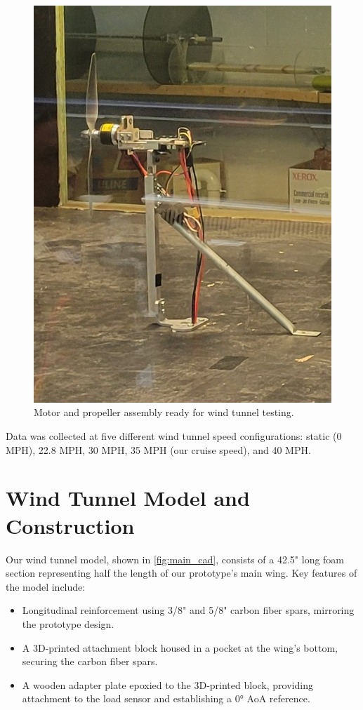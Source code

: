 \begin{figure}[htpb]
    \centering
    \includegraphics[width=0.88\linewidth]{figures/propulsion_data/motor_testing_setup.jpg}
    \caption{Motor and propeller assembly ready for wind tunnel testing.}
    \label{fig:motor_testing_setup}
\end{figure}

Data was collected at five different wind tunnel speed configurations: static (0 MPH), 22.8 MPH, 30 MPH, 35 MPH (our cruise speed), and 40 MPH.

\newpage

\section{Wind Tunnel Model and Construction}


Our wind tunnel model, shown in \autoref{fig:main_cad}, consists of a 42.5" long foam section representing half the length of our prototype's main wing. Key features of the model include:

\begin{itemize}
    \item Longitudinal reinforcement using 3/8" and 5/8" carbon fiber spars, mirroring the prototype design.
    \item A 3D-printed attachment block housed in a pocket at the wing's bottom, securing the carbon fiber spars.
    \item A wooden adapter plate epoxied to the 3D-printed block, providing attachment to the load sensor and establishing a 0° AoA reference.
\end{itemize}

